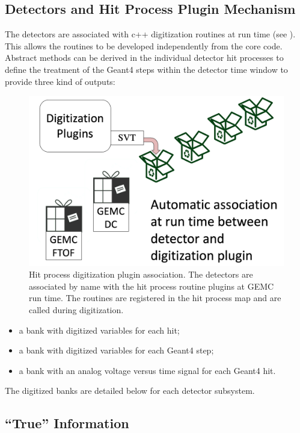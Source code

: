 \subsection{Detectors and Hit Process Plugin Mechanism}

The detectors are associated with c++ digitization routines at run time (see ).
This allows the routines to be developed independently from the core code. Abstract methods can be derived in
the individual detector hit processes to define the treatment of the Geant4 steps within the detector
time window to provide three kind of outputs:

\begin{figure}
	\centering
	\includegraphics[width=1.0\columnwidth,keepaspectratio]{img/pluginsAssociation.png}
	\caption{Hit process digitization plugin association. The detectors are associated by name with the hit process routine
             plugins at GEMC run time. The routines are registered in the hit process map and are called during digitization.}
	\label{fig:pluginsAssociation}
\end{figure}


\begin{itemize}
	\item a bank with digitized variables for each hit;
	\item a bank with digitized variables for each Geant4 step;
	\item a bank with an analog voltage versus time signal for each Geant4 hit.
\end{itemize}

The digitized banks are detailed below for each detector subsystem.

\subsection{``True'' Information}

